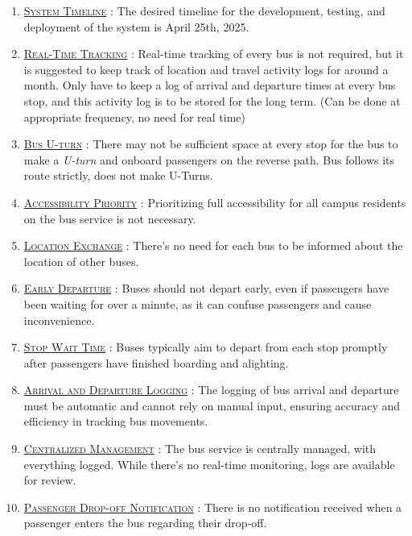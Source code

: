 \begin{enumerate}
    \item \underline{\textsc{System Timeline}} : The desired timeline for the development, testing, and deployment of the system is April 25th, 2025.

    \item {}\underline{\textsc{Real-Time Tracking}} : Real-time tracking of every bus is not required, but it is suggested to keep track of location and travel activity logs for around a month. Only have to keep a log of arrival and departure times at every bus stop, and this activity log is to be stored for the long term. (Can be done at appropriate frequency, no need for real time)

    \item {}\underline{\textsc{Bus \gls{U-turn}}} : There may not be sufficient space at every stop for the bus to make a \textit{\gls{U-turn}} and onboard passengers on the reverse path. Bus follows its route strictly, does not make U-Turns.

    \item {}\underline{\textsc{Accessibility Priority}} : Prioritizing full accessibility for all campus residents on the bus service is not necessary.

    \item \underline{\textsc{Location Exchange}} : There's no need for each bus to be informed about the location of other buses.

    \item \underline{\textsc{Early Departure}} : Buses should not depart early, even if passengers have been waiting for over a minute, as it can confuse passengers and cause inconvenience.

    \item \underline{\textsc{Stop Wait Time}} : Buses typically aim to depart from each stop promptly after passengers have finished boarding and alighting.

    \item \underline{\textsc{Arrival and Departure Logging}} : The logging of bus arrival and departure must be automatic and cannot rely on manual input, ensuring accuracy and efficiency in tracking bus movements.

    \item \underline{\textsc{Centralized Management}} : The bus service is centrally managed, with everything logged. While there's no real-time monitoring, logs are available for review.

    \item \underline{\textsc{Passenger Drop-off Notification}} : There is no notification received when a passenger enters the bus regarding their drop-off.


\end{enumerate}
